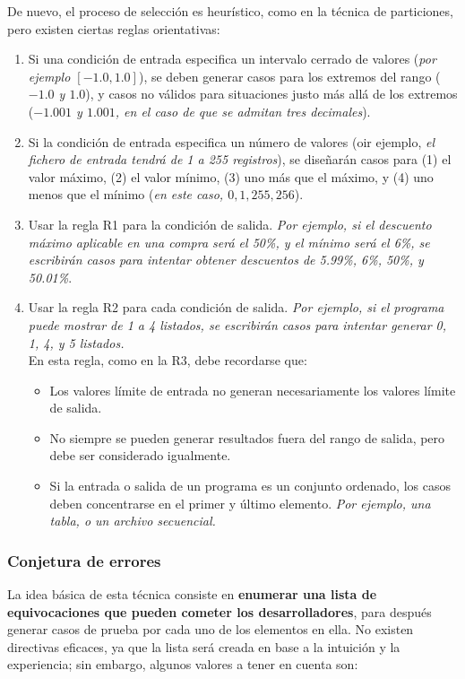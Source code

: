 De nuevo, el proceso de selección es heurístico, como en la técnica de particiones, pero existen ciertas reglas orientativas:

\begin{enumerate}[R1.]
    \item Si una condición de entrada especifica un intervalo cerrado de valores (\textit{por ejemplo $[-1.0, 1.0]$}), se deben generar casos para los extremos del rango (\textit{$-1.0$ y $1.0$}), y casos no válidos para situaciones justo más allá de los extremos (\textit{$-1.001$ y $1.001$, en el caso de que se admitan tres decimales}).
    \item Si la condición de entrada especifica un número de valores (oir ejemplo, \textit{el fichero de entrada tendrá de 1 a 255 registros}), se diseñarán casos para (1) el valor máximo, (2) el valor mínimo, (3) uno más que el máximo, y (4) uno menos que el mínimo (\textit{en este caso, $0, 1, 255, 256$}).
    \item Usar la regla R1 para la condición de salida. \textit{Por ejemplo, si el descuento máximo aplicable en una compra será el 50\%, y el mínimo será el 6\%, se escribirán casos para intentar obtener descuentos de 5.99\%, 6\%, 50\%, y 50.01\%}.
    \item Usar la regla R2 para cada condición de salida. \textit{Por ejemplo, si el programa puede mostrar de 1 a 4 listados, se escribirán casos para intentar generar 0, 1, 4, y 5 listados.}\\
    En esta regla, como en la R3, debe recordarse que:
    \begin{itemize}
        \item Los valores límite de entrada no generan necesariamente los valores límite de salida.
        \item No siempre se pueden generar resultados fuera del rango de salida, pero debe ser considerado igualmente.
        \item Si la entrada o salida de un programa es un conjunto ordenado, los casos deben concentrarse en el primer y último elemento. \textit{Por ejemplo, una tabla, o un archivo secuencial.}
    \end{itemize}
\end{enumerate}

\subsubsection{Conjetura de errores}

La idea básica de esta técnica consiste en \textbf{enumerar una lista de equivocaciones que pueden cometer los desarrolladores}, para después generar casos de prueba por cada uno de los elementos en ella. No existen directivas eficaces, ya que la lista será creada en base a la intuición y la experiencia; sin embargo, algunos valores a tener en cuenta son:

